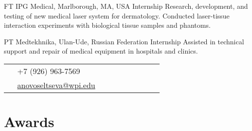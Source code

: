 \documentclass[10pt]{article} %
\begin{document}
\begin{paracol}{2}
{FT} %
{IPG Medical, Marlborough, MA, USA} %
{Internship} %
{Research, development, and testing of new medical laser system for dermatology. Conducted laser-tissue interaction experiments with biological tissue samples and phantoms.}  %


{PT} %
{Medtekhnika, Ulan-Ude, Russian Federation} %
{Internship} %
{Assisted in technical support and repair of medical equipment in hospitals and clinics.} %


\vspace{-\baselineskip}\medskip %

\switchcolumn %


\parbox[top][0.06\textheight][c]{\linewidth}{ %
	\vspace{-0.04\textheight} %
	\colorbox{shade}{ %
		\begin{supertabular}{p{0.05\linewidth}|p{0.775\linewidth}} %
			\raisebox{-1pt}{\faPhone} & +7 (926) 963-7569 \\ %
			\raisebox{0pt}{\small\faEnvelope} & \href{mailto:anovoseltseva@wpi.edu}{anovoseltseva@wpi.edu} \\ 
		\end{supertabular}
	}
}


\section{Awards}


\end{paracol}
\end{document}
